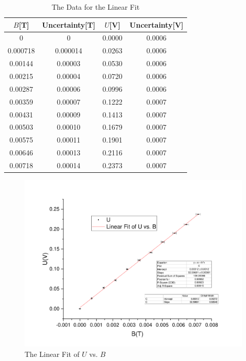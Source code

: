 \documentclass[a4paper]{article}
\begin{document}
    \begin{table}[H]
        \centering
        \begin{tabular}{|c|c|c|c|}
            \hline
            $B$[T]&Uncertainty[T]&$U$[V]&Uncertainty[V]\\\hline
            0&0&0.0000&0.0006\\\hline
            0.000718&0.000014&0.0263&0.0006\\\hline
            0.00144&0.00003&0.0530&0.0006\\\hline
            0.00215&0.00004&0.0720&0.0006\\\hline
            0.00287&0.00006&0.0996&0.0006\\\hline
            0.00359&0.00007&0.1222&0.0007\\\hline
            0.00431&0.00009&0.1413&0.0007\\\hline
            0.00503&0.00010&0.1679&0.0007\\\hline
            0.00575&0.00011&0.1901&0.0007\\\hline
            0.00646&0.00013&0.2116&0.0007\\\hline
            0.00718&0.00014&0.2373&0.0007\\\hline
        \end{tabular}
        \caption{The Data for the Linear Fit}
        \label{tab:UvsB}
    \end{table}
    \begin{figure}[H]
        \centering
        \includegraphics[width=\textwidth]{fig/UvsB.pdf}
        \caption{The Linear Fit of $U$ vs. $B$}
        \label{fig:UvsB}
    \end{figure}
\end{document}
